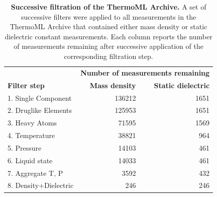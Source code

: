 \documentclass[aps,pre,twocolumn,nofootinbib,superscriptaddress,linenumbers]{revtex4-1}
\begin{document}

\begin{table}
\begin{tabular}{lrr}
\hline
 &  \multicolumn{2}{c}{\bf Number of measurements remaining} \\ \cline{2-3}
{\bf Filter step} &  {\bf Mass density} &  {\bf Static dielectric} \\ 
\hline
1.  Single Component   &               136212 &                                     1651 \\
2.  Druglike Elements  &               125953 &                                     1651 \\
3.  Heavy Atoms        &                71595 &                                     1569 \\
4.  Temperature        &                38821 &                                      964 \\
5.  Pressure           &                14103 &                                      461 \\
6.  Liquid state       &                14033 &                                      461 \\
7.  Aggregate T, P     &                 3592 &                                      432 \\
8.  Density+Dielectric &                  246 &                                      246 \\

\hline
\end{tabular}
\caption{{\bf Successive filtration of the ThermoML Archive.}
A set of successive filters were applied to all measurements in the ThermoML Archive that contained either mass density or static dielectric constant measurements.
Each column reports the number of measurements remaining after successive application of the corresponding filtration step.
}
\label{table:ThermoMLSummary}
\end{table}
\end{document}
